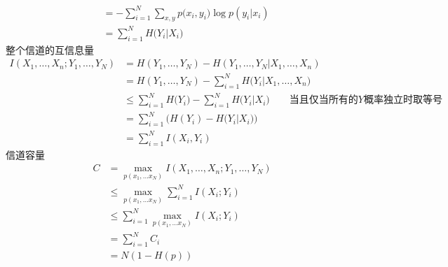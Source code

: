 \documentclass{exam}
\begin{document}
\begin{CJK*}{UTF8}{gbsn}
\begin{questions}
\begin{solution}
\begin{equation*}
\begin{split}
        	&  =  - \sum\limits_{i = 1}^N {\sum\limits_{x,y} {p(} {x_i},{y_i})\log p({y_i}|{x_i})}  \\
        	& = \sum\limits_{i = 1}^N {H({Y_i}|} {X_i})
        	\end{split}
        	\end{equation*}
        	整个信道的互信息量
        	\begin{equation*}
        	\begin{split}
        	I({X_1}, \ldots ,{X_n};{Y_1}, \ldots ,{Y_N}) &= H({Y_1}, \ldots ,{Y_N}) - H({Y_1}, \ldots ,{Y_N}|{X_1}, \ldots ,{X_n})\\
        	& = H({Y_1}, \ldots ,{Y_N}) - \sum\limits_{i = 1}^N {H({Y_i}|} {X_1}, \ldots ,{X_n})\\
        	&  \le \sum\limits_{i = 1}^N {H({Y_i}} ) - \sum\limits_{i = 1}^N {H({Y_i}|} {X_i})\qquad \text{当且仅当所有的$Y$概率独立时取等号}\\
        	& = \sum\limits_{i = 1}^N {(H({Y_i}) - H({Y_i}|} {X_i}))\\
        	& = \sum\limits_{i = 1}^N {I({X_i},{Y_i})} 
        	\end{split}
        	\end{equation*}
        	信道容量
        	\begin{equation*}
        	\begin{split}
        	C &= \mathop {\max }\limits_{p({x_1}, \ldots {x_N})} I({X_1}, \ldots ,{X_n};{Y_1}, \ldots ,{Y_N})\\
        	& \le \mathop {\max }\limits_{p({x_1}, \ldots {x_N})} \sum\limits_{i = 1}^N {I({X_i};{Y_i})} \\
        	& \le \sum\limits_{i = 1}^N {\mathop {\max }\limits_{p({x_1}, \ldots {x_N})} I({X_i};{Y_i})} \\
        	& = \sum\limits_{i = 1}^N {{C_i}}\\
        	& = N(1 - H(p))
        	\end{split}
        	\end{equation*}
        \end{solution}
    \end{questions}
\end{CJK*}
\end{document}
